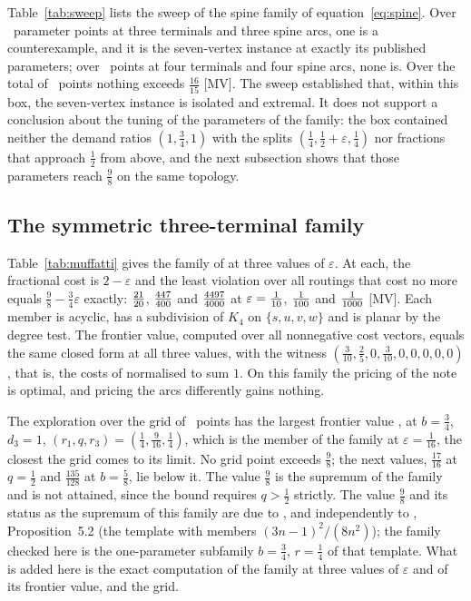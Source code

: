 \documentclass[11pt]{article}
\theoremstyle{remark}
\begin{document}


Table~\ref{tab:sweep} lists the sweep of the spine family of equation~\eqref{eq:spine}. Over \nfamthree\ parameter points at three terminals and three spine arcs, one is a counterexample, and it is the seven-vertex instance at exactly its published parameters; over \nfamfour\ points at four terminals and four spine arcs, none is. Over the total of \nfamtotal\ points nothing exceeds $\tfrac{16}{15}$ [MV]. The sweep established that, within this box, the seven-vertex instance is isolated and extremal. It does not support a conclusion about the tuning of the
parameters of the family: the box contained neither the demand ratios $(1,\tfrac34,1)$ with the splits $(\tfrac14,\tfrac12+\varepsilon,\tfrac14)$ nor fractions that approach $\tfrac12$ from above, and the next subsection shows that those parameters reach $\tfrac98$ on the same topology.

\subsection{The symmetric three-terminal family}
\label{sec:muffatti}

Table~\ref{tab:muffatti} gives the family of \cite{Muf26} at three values of $\varepsilon$. At each, the fractional cost is $2-\varepsilon$ and the least violation over all routings that cost no more equals $\tfrac98-\tfrac34\varepsilon$ exactly: $\tfrac{21}{20}$, $\tfrac{447}{400}$ and $\tfrac{4497}{4000}$ at $\varepsilon=\tfrac{1}{10}$, $\tfrac{1}{100}$ and $\tfrac{1}{1000}$ [MV]. Each member is acyclic, has a subdivision of $K_4$ on $\{s,u,v,w\}$ and is planar by the degree test. The frontier value, computed over all
nonnegative cost vectors, equals the same closed form at all three values, with the witness $(\tfrac3{10},\tfrac25,0,\tfrac3{10},0,0,0,0,0)$, that is, the costs of \cite{Muf26} normalised to sum $1$. On this family the pricing of the note is optimal, and pricing the arcs differently gains nothing.



The exploration over the grid of \ngridpoints\ points has the largest frontier value \ngridmax, at $b=\tfrac34$, $d_3=1$, $(r_1,q,r_3)=(\tfrac14,\tfrac9{16},\tfrac14)$, which is the member of the family at $\varepsilon=\tfrac1{16}$, the closest the grid comes to its limit. No grid point exceeds $\tfrac98$; the next values, $\tfrac{17}{16}$ at $q=\tfrac12$ and $\tfrac{135}{128}$ at $b=\tfrac58$, lie below it. The value $\tfrac98$ is the supremum of the family and is not attained, since the bound requires $q>\tfrac12$ strictly.
The value $\tfrac98$ and its status as the supremum of this family are due to \cite{Muf26}, and independently to \cite{Nik1}, Proposition~5.2 (the template with members $(3n-1)^2/(8n^2)$); the family checked here is the one-parameter subfamily $b=\tfrac34$, $r=\tfrac14$ of that template. What is added here is the exact computation of the family at three values of $\varepsilon$ and of its frontier value, and the grid.
\end{document}
